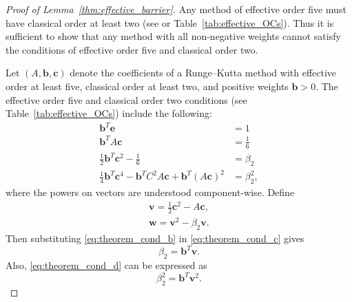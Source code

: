 \begin{proof}[Proof of Lemma~\ref{thm:effective_barrier}]
	Any method of effective order five must have classical order at least two
	(see \cite{Butcher2008_book} or Table~\ref{tab:effective_OCs}).
    Thus it is sufficient to show that any method with all non-negative weights
    cannot satisfy the conditions of effective order five and classical order two.

    Let $(A,\bm{b},\bm{c})$ denote the coefficients of a Runge--Kutta method with
    effective order at least five, classical order at least two, and positive 
    weights $\bm{b} > 0$.
    The effective order five and classical order two conditions
    (see Table~\ref{tab:effective_OCs}) include the following:
    \begin{subequations}\label{eq:theorem_cond}
    		\begin{align}
    			\bm{b}^T\bm{e} & = 1 \label{eq:theorem_cond_a} \\
             	\bm{b}^TA\bm{c} &= \frac{1}{6} \label{eq:theorem_cond_b} \\
            	\frac{1}{2}\bm{b}^T\bm{c}^2 - \frac{1}{6} &= \beta_2 \label{eq:theorem_cond_c} \\
            	\frac{1}{4}\bm{b}^T\bm{c}^4 - \bm{b}^TC^2A\bm{c} + \bm{b}^T(A\bm{c})^2 &= \beta_2^2, \label{eq:theorem_cond_d}
        	\end{align}
	\end{subequations}
	where the powers on vectors are understood component-wise. 
	Define
	\begin{align*} 
		\bm{v} = \frac{1}{2}\bm{c}^2 - A\bm{c}, \\
		\bm{w} = \bm{v}^{2} - \beta_{2}\bm{v}.
	\end{align*}
	Then substituting \eqref{eq:theorem_cond_b} in \eqref{eq:theorem_cond_c} gives
	\begin{equation}\label{eq:btv}
		\beta_2 = \bm{b}^T\bm{v}.
	\end{equation}
	Also, \eqref{eq:theorem_cond_d} can be expressed as
	\begin{equation}\label{eq:btv2}
		\beta_2^2 = \bm{b}^T\bm{v}^2.

\end{equation}
\end{proof}
